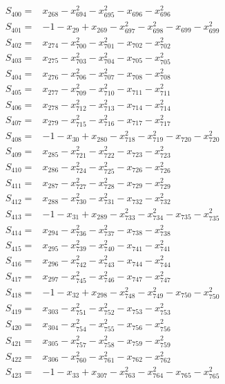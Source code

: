 \begin{align*}
S_{400}={}&x_{268}-x_{694}^{2}-x_{695}^{2}-x_{696}-x_{696}^{2}\\[3pt]
S_{401}={}&-1-x_{29}+x_{269}-x_{697}^{2}-x_{698}^{2}-x_{699}-x_{699}^{2}\\[3pt]
S_{402}={}&x_{274}-x_{700}^{2}-x_{701}^{2}-x_{702}-x_{702}^{2}\\[3pt]
S_{403}={}&x_{275}-x_{703}^{2}-x_{704}^{2}-x_{705}-x_{705}^{2}\\[3pt]
S_{404}={}&x_{276}-x_{706}^{2}-x_{707}^{2}-x_{708}-x_{708}^{2}\\[3pt]
S_{405}={}&x_{277}-x_{709}^{2}-x_{710}^{2}-x_{711}-x_{711}^{2}\\[3pt]
S_{406}={}&x_{278}-x_{712}^{2}-x_{713}^{2}-x_{714}-x_{714}^{2}\\[3pt]
S_{407}={}&x_{279}-x_{715}^{2}-x_{716}^{2}-x_{717}-x_{717}^{2}\\[3pt]
S_{408}={}&-1-x_{30}+x_{280}-x_{718}^{2}-x_{719}^{2}-x_{720}-x_{720}^{2}\\[3pt]
S_{409}={}&x_{285}-x_{721}^{2}-x_{722}^{2}-x_{723}-x_{723}^{2}\\[3pt]
S_{410}={}&x_{286}-x_{724}^{2}-x_{725}^{2}-x_{726}-x_{726}^{2}\\[3pt]
S_{411}={}&x_{287}-x_{727}^{2}-x_{728}^{2}-x_{729}-x_{729}^{2}\\[3pt]
S_{412}={}&x_{288}-x_{730}^{2}-x_{731}^{2}-x_{732}-x_{732}^{2}\\[3pt]
S_{413}={}&-1-x_{31}+x_{289}-x_{733}^{2}-x_{734}^{2}-x_{735}-x_{735}^{2}\\[3pt]
S_{414}={}&x_{294}-x_{736}^{2}-x_{737}^{2}-x_{738}-x_{738}^{2}\\[3pt]
S_{415}={}&x_{295}-x_{739}^{2}-x_{740}^{2}-x_{741}-x_{741}^{2}\\[3pt]
S_{416}={}&x_{296}-x_{742}^{2}-x_{743}^{2}-x_{744}-x_{744}^{2}\\[3pt]
S_{417}={}&x_{297}-x_{745}^{2}-x_{746}^{2}-x_{747}-x_{747}^{2}\\[3pt]
S_{418}={}&-1-x_{32}+x_{298}-x_{748}^{2}-x_{749}^{2}-x_{750}-x_{750}^{2}\\[3pt]
S_{419}={}&x_{303}-x_{751}^{2}-x_{752}^{2}-x_{753}-x_{753}^{2}\\[3pt]
S_{420}={}&x_{304}-x_{754}^{2}-x_{755}^{2}-x_{756}-x_{756}^{2}\\[3pt]
S_{421}={}&x_{305}-x_{757}^{2}-x_{758}^{2}-x_{759}-x_{759}^{2}\\[3pt]
S_{422}={}&x_{306}-x_{760}^{2}-x_{761}^{2}-x_{762}-x_{762}^{2}\\[3pt]
S_{423}={}&-1-x_{33}+x_{307}-x_{763}^{2}-x_{764}^{2}-x_{765}-x_{765}^{2}\\[3pt]

\end{align*}
